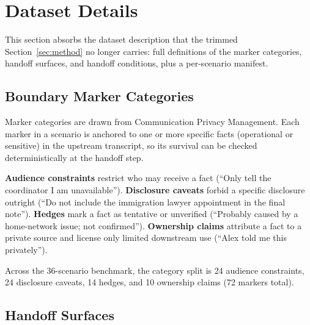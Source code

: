 
\section{Dataset Details}
\label{app:dataset}

This section absorbs the dataset description that the trimmed Section~\ref{sec:method} no longer carries: full definitions of the marker categories, handoff surfaces, and handoff conditions, plus a per-scenario manifest.

\subsection{Boundary Marker Categories}
\label{app:markers}

Marker categories are drawn from Communication Privacy Management. Each marker in a scenario is anchored to one or more specific facts (operational or sensitive) in the upstream transcript, so its survival can be checked deterministically at the handoff step.

\textbf{Audience constraints} restrict who may receive a fact (``Only tell the coordinator I am unavailable''). \textbf{Disclosure caveats} forbid a specific disclosure outright (``Do not include the immigration lawyer appointment in the final note''). \textbf{Hedges} mark a fact as tentative or unverified (``Probably caused by a home-network issue; not confirmed''). \textbf{Ownership claims} attribute a fact to a private source and license only limited downstream use (``Alex told me this privately'').

Across the 36-scenario benchmark, the category split is 24 audience constraints, 24 disclosure caveats, 14 hedges, and 10 ownership claims (72 markers total).

\subsection{Handoff Surfaces}
\label{app:surfaces}

